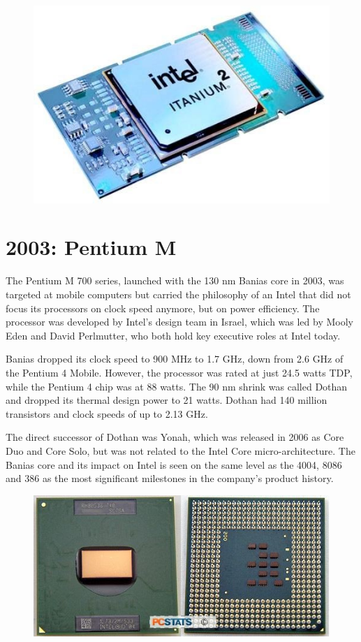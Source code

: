\begin{figure}[ht!]
	\centering
\includegraphics[scale=0.5]{media/image22.jpeg}
\end{figure}

\hypertarget{pentium-m}{%
\section{2003: Pentium M}\label{pentium-m}}

The Pentium M 700 series, launched with the 130 nm Banias core in 2003,
was targeted at mobile computers but carried the philosophy of an Intel
that did not focus its processors on clock speed anymore, but on power
efficiency. The processor was developed by Intel's design team in
Israel, which was led by Mooly Eden and David Perlmutter, who both hold
key executive roles at Intel today.

Banias dropped its clock speed to 900 MHz to 1.7 GHz, down from 2.6 GHz
of the Pentium 4 Mobile. However, the processor was rated at just 24.5
watts TDP, while the Pentium 4 chip was at 88 watts. The 90 nm shrink
was called Dothan and dropped its thermal design power to 21 watts.
Dothan had 140 million transistors and clock speeds of up to 2.13 GHz.

The direct successor of Dothan was Yonah, which was released in 2006 as
Core Duo and Core Solo, but was not related to the Intel Core
micro-architecture. The Banias core and its impact on Intel is seen on
the same level as the 4004, 8086 and 386 as the most significant
milestones in the company's product history.

\begin{figure}[ht!]
	\centering
\includegraphics[scale=0.5]{media/image23.jpeg}
\end{figure}

